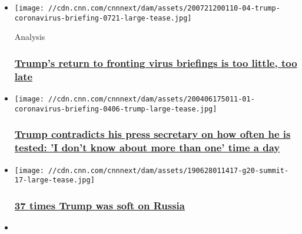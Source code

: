 \begin{itemize}
\item
  \href{/2020/07/22/politics/donald-trump-coronavirus/index.html}{}

  \texttt{[image: //cdn.cnn.com/cnnnext/dam/assets/200721200110-04-trump-coronavirus-briefing-0721-large-tease.jpg]}

  Analysis

  \hypertarget{trumps-return-to-fronting-virus-briefings-is-too-little-too-late}{%
  \subsubsection{\texorpdfstring{\href{/2020/07/22/politics/donald-trump-coronavirus/index.html}{Trump's
  return to fronting virus briefings is too little, too
  late}}{Trump's return to fronting virus briefings is too little, too late}}\label{trumps-return-to-fronting-virus-briefings-is-too-little-too-late}}
\item
  \href{/2020/07/21/politics/donald-trump-coronavirus-tests/index.html}{}

  \texttt{[image: //cdn.cnn.com/cnnnext/dam/assets/200406175011-01-coronavirus-briefing-0406-trump-large-tease.jpg]}

  \hypertarget{trump-contradicts-his-press-secretary-on-how-often-he-is-tested-i-dont-know-about-more-than-one-time-a-day}{%
  \subsubsection{\texorpdfstring{\href{/2020/07/21/politics/donald-trump-coronavirus-tests/index.html}{Trump
  contradicts his press secretary on how often he is tested: 'I don't
  know about more than one' time a
  day}}{Trump contradicts his press secretary on how often he is tested: 'I don't know about more than one' time a day}}\label{trump-contradicts-his-press-secretary-on-how-often-he-is-tested-i-dont-know-about-more-than-one-time-a-day}}
\item
  \href{/2019/11/17/politics/trump-soft-on-russia/index.html}{}

  \texttt{[image: //cdn.cnn.com/cnnnext/dam/assets/190628011417-g20-summit-17-large-tease.jpg]}

  \hypertarget{37-times-trump-was-soft-on-russia}{%
  \subsubsection{\texorpdfstring{\href{/2019/11/17/politics/trump-soft-on-russia/index.html}{37
  times Trump was soft on
  Russia}}{37 times Trump was soft on Russia}}\label{37-times-trump-was-soft-on-russia}}
\item
  \href{/2020/07/24/politics/trump-drug-prices/index.html}{}


\end{itemize}
